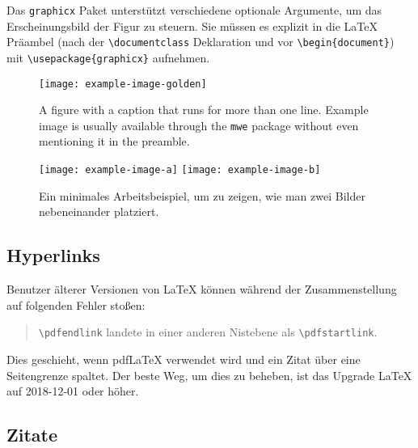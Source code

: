 \documentclass[11pt]{article}
\begin{document}
Das \verb|graphicx| Paket unterstützt verschiedene optionale Argumente, um das Erscheinungsbild der Figur zu steuern. Sie müssen es explizit in die \LaTeX{} Präambel (nach der \verb|\documentclass| Deklaration und vor \verb|\begin{document}|) mit \verb|\usepackage{graphicx}| aufnehmen.

\begin{figure}[t]
  \texttt{[image: example-image-golden]}
  \caption{A figure with a caption that runs for more than one line.
    Example image is usually available through the \texttt{mwe} package
    without even mentioning it in the preamble.}
  \label{fig:experiments}
\end{figure}

\begin{figure*}[t]
  \texttt{[image: example-image-a]} \hfill\texttt{[image: example-image-b]}
  \caption{Ein minimales Arbeitsbeispiel, um zu zeigen, wie man zwei Bilder nebeneinander platziert.}
\end{figure*}

\subsection{Hyperlinks}

Benutzer älterer Versionen von \LaTeX{} können während der Zusammenstellung auf folgenden Fehler stoßen:
\begin{quote}
\verb|\pdfendlink| landete in einer anderen Nistebene als \verb|\pdfstartlink|.
\end{quote}
Dies geschieht, wenn pdf\LaTeX{} verwendet wird und ein Zitat über eine Seitengrenze spaltet. Der beste Weg, um dies zu beheben, ist das Upgrade \LaTeX{} auf 2018-12-01 oder höher.

\subsection{Zitate}
\end{document}
